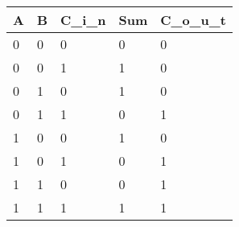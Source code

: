 \begin{tabular}{|l|l|l|l|l|}
\hline
A & B & C_i_n & Sum & C_o_u_t \\ \hline
0 & 0 & 0     & 0      & 0    \\
0 & 0 & 1     & 1      & 0    \\
0 & 1 & 0     & 1      & 0    \\ 
0 & 1 & 1     & 0      & 1    \\
1 & 0 & 0     & 1      & 0    \\
1 & 0 & 1     & 0      & 1    \\
1 & 1 & 0     & 0      & 1    \\
1 & 1 & 1     & 1      & 1    \\ \hline
\end{tabular}
